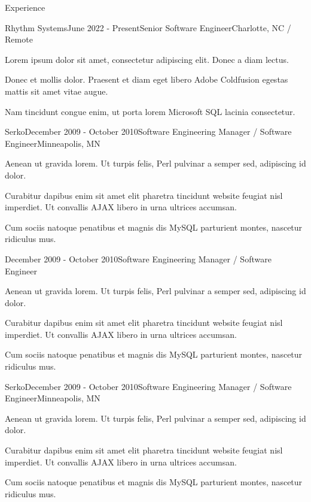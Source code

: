 \documentclass[
	11pt, %
]{resume} %
\begin{document}
\begin{rSection}{Experience}

	\begin{rSubsection}{Rhythm Systems}{June 2022 - Present}{Senior Software Engineer}{Charlotte, NC / Remote}
		\item Lorem ipsum dolor sit amet, consectetur adipiscing elit. Donec a diam lectus.
		\item Donec et mollis dolor. Praesent et diam eget libero Adobe Coldfusion egestas mattis sit amet vitae augue.
		\item Nam tincidunt congue enim, ut porta lorem Microsoft SQL lacinia consectetur.
	\end{rSubsection}


	\begin{rSubsection}{Serko}{December 2009 - October 2010}{Software Engineering Manager / Software Engineer}{Minneapolis, MN}
		\item Aenean ut gravida lorem. Ut turpis felis, Perl pulvinar a semper sed, adipiscing id dolor.
		\item Curabitur dapibus enim sit amet elit pharetra tincidunt website feugiat nisl imperdiet. Ut convallis AJAX libero in urna ultrices accumsan.
		\item Cum sociis natoque penatibus et magnis dis MySQL parturient montes, nascetur ridiculus mus.
	\end{rSubsection}
	\begin{rSubsection}{}{December 2009 - October 2010}{Software Engineering Manager / Software Engineer}{}
		\item Aenean ut gravida lorem. Ut turpis felis, Perl pulvinar a semper sed, adipiscing id dolor.
		\item Curabitur dapibus enim sit amet elit pharetra tincidunt website feugiat nisl imperdiet. Ut convallis AJAX libero in urna ultrices accumsan.
		\item Cum sociis natoque penatibus et magnis dis MySQL parturient montes, nascetur ridiculus mus.
	\end{rSubsection}
	\begin{rSubsection}{Serko}{December 2009 - October 2010}{Software Engineering Manager / Software Engineer}{Minneapolis, MN}
		\item Aenean ut gravida lorem. Ut turpis felis, Perl pulvinar a semper sed, adipiscing id dolor.
		\item Curabitur dapibus enim sit amet elit pharetra tincidunt website feugiat nisl imperdiet. Ut convallis AJAX libero in urna ultrices accumsan.
		\item Cum sociis natoque penatibus et magnis dis MySQL parturient montes, nascetur ridiculus mus.
	\end{rSubsection}


\end{rSection}
\end{document}
